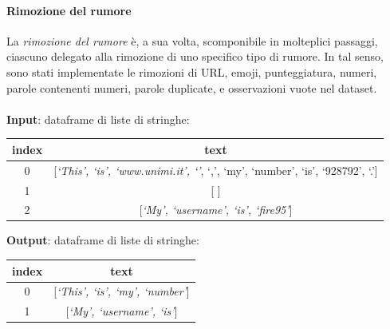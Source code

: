 \documentclass[12pt]{report}
\theoremstyle{definition}
\begin{document}
\paragraph{Rimozione del rumore}
La \textit{rimozione del rumore} è, a sua volta, scomponibile in molteplici passaggi, ciascuno delegato alla rimozione di uno specifico tipo di rumore.
In tal senso, sono stati implementate le rimozioni di URL, emoji, punteggiatura, numeri, parole contenenti numeri, parole duplicate, e osservazioni vuote nel dataset. 
\\
\\
\textbf{Input}: dataframe di liste di stringhe:
\begin{center}
    \begin{tabular}{|c|c|}
    \hline
    \textbf{index} & \textbf{text} \\
    \hline
         0 & [\textit{`This', `is', `www.unimi.it', `\smiley{}'}, `,', `my', `number', `is', `928792', `.']\\
         1 & [\textit{ }] \\
         2 & [\textit{`My', `username', `is', `fire95'}] \\
    \hline
    \end{tabular}
\end{center}
\textbf{Output}: dataframe di liste di stringhe:
\begin{center}
    \begin{tabular}{|c|c|}
    \hline
    \textbf{index} & \textbf{text} \\
    \hline
         0 & [\textit{`This', `is', `my', `number'}]\\
         1 & [\textit{`My', `username', `is'}] \\
    \hline
    \end{tabular}
\end{center}
\end{document}
